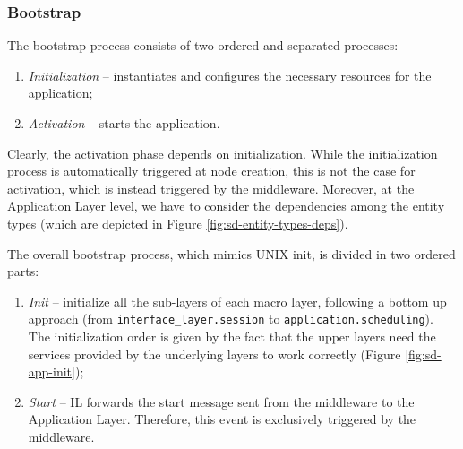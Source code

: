 \subsubsection{Bootstrap}

The bootstrap process consists of two ordered and separated processes:

\begin{enumerate}
  \item \textit{Initialization} -- instantiates and configures the necessary
    resources for the application;
  \item \textit{Activation} -- starts the application.
\end{enumerate}

Clearly, the activation phase depends on initialization.
While the initialization process is automatically triggered at node creation,
this is not the case for activation, which is instead triggered by the
middleware.
Moreover, at the Application Layer level, we have to consider the dependencies
among the entity types (which are depicted in Figure
\ref{fig:sd-entity-types-deps}).

The overall bootstrap process, which mimics UNIX init\cite{online-tlsag},
is divided in two ordered parts:
\begin{enumerate}
  \item \textit{Init} -- initialize all the sub-layers of each macro layer,
  following a bottom up approach (from \verb|interface_layer.session| to
  \verb|application.scheduling|).
  The initialization order is given by the fact that the upper
  layers need the services provided by the underlying layers to work
  correctly (Figure \ref{fig:sd-app-init});
  \item \textit{Start} -- IL forwards the start message sent from the
  middleware to the Application Layer.
  Therefore, this event is exclusively triggered by the middleware.
\end{enumerate}

